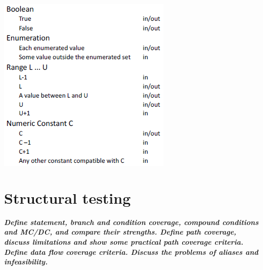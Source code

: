 \documentclass{article}
\begin{document}
\begin{center}
        \includegraphics[scale = 0.8]{image/17.PNG}
\end{center}

\newpage
\section{Structural testing}
\textbf{\textit{Define statement, branch and condition coverage, compound conditions and MC/DC, and compare their strengths. Define
path coverage, discuss limitations and show some practical path coverage
criteria. Define data flow coverage criteria. Discuss the problems of aliases
and infeasibility.}}
\end{document}
